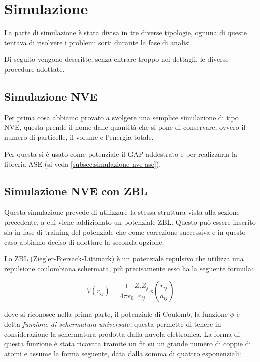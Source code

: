 \documentclass[a4paper,11pt,openany]{book}
\begin{document}
\section{Simulazione}

La parte di simulazione è stata divisa in tre diverse tipologie, ognuna di queste tentava di risolvere i problemi sorti durante la fase di analisi.

Di seguito vengono descritte, senza entrare troppo nei dettagli, le diverse procedure adottate.

\subsection{Simulazione NVE}

Per prima cosa abbiamo provato a svolgere una semplice simulazione di tipo NVE, questa prende il nome dalle quantità che si pone di conservare, ovvero il numero di particelle, il volume e l'energia totale.

Per questa si è usato come potenziale il GAP addestrato e per realizzarla la libreria ASE (si veda \autoref{subsec:simulazione-nve-ase}).

\subsection{Simulazione NVE con ZBL}

Questa simulazione prevede di utilizzare la stessa struttura vista alla sezione precedente, a cui viene addizionato un potenziale ZBL. Questo può essere inserito sia in fase di training del potenziale che come correzione successiva e in questo caso abbiamo deciso di adottare la seconda opzione. 

Lo ZBL (Ziegler-Biersack-Littmark) è un potenziale repulsivo che utilizza una repulsione coulombiana schermata, più precisamente esso ha la seguente formula:

\begin{equation}
    V(r_{ij}) = \frac{1}{4\pi\epsilon_0}\frac{Z_iZ_j}{r_{ij}} \phi\left(\frac{r_{ij}}{a_{ij}}\right)
\end{equation}

dove si riconosce nella prima parte, il potenziale di Coulomb, la funzione $\phi$ è detta \textit{funzione di schermatura universale}, questa permette di tenere in considerazione la schermatura prodotta dalla nuvola elettronica. La forma di questa funzione è stata ricavata tramite un fit su un grande numero di coppie di atomi e assume la forma seguente, data dalla somma di quattro esponenziali:
\end{document}
